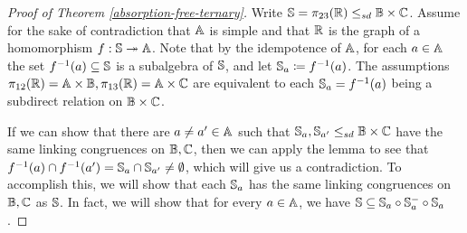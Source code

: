 \documentclass[letterpaper,11pt]{article}
\begin{document}
\begin{proof}[Proof of Theorem \ref{absorption-free-ternary}] Write $\mathbb{S} = \pi_{23}(\mathbb{R}) \le_{sd} \mathbb{B} \times \mathbb{C}$. Assume for the sake of contradiction that $\mathbb{A}$ is simple and that $\mathbb{R}$ is the graph of a homomorphism $f : \mathbb{S} \twoheadrightarrow \mathbb{A}$. Note that by the idempotence of $\mathbb{A}$, for each $a \in \mathbb{A}$ the set $f^{-1}(a) \subseteq \mathbb{S}$ is a subalgebra of $\mathbb{S}$, and let $\mathbb{S}_a \coloneqq f^{-1}(a)$. The assumptions $\pi_{12}(\mathbb{R}) = \mathbb{A} \times \mathbb{B}, \pi_{13}(\mathbb{R}) = \mathbb{A} \times \mathbb{C}$ are equivalent to each $\mathbb{S}_a = f^{-1}(a)$ being a subdirect relation on $\mathbb{B} \times \mathbb{C}$.

If we can show that there are $a \ne a' \in \mathbb{A}$ such that $\mathbb{S}_a, \mathbb{S}_{a'} \le_{sd} \mathbb{B} \times \mathbb{C}$ have the same linking congruences on $\mathbb{B}, \mathbb{C}$, then we can apply the lemma to see that $f^{-1}(a) \cap f^{-1}(a') = \mathbb{S}_a \cap \mathbb{S}_{a'} \ne \emptyset$, which will give us a contradiction. To accomplish this, we will show that each $\mathbb{S}_a$ has the same linking congruences on $\mathbb{B}, \mathbb{C}$ as $\mathbb{S}$. In fact, we will show that for every $a \in \mathbb{A}$, we have $\mathbb{S} \subseteq \mathbb{S}_a\circ \mathbb{S}_a^{-} \circ \mathbb{S}_a$.


\end{proof}
\end{document}
